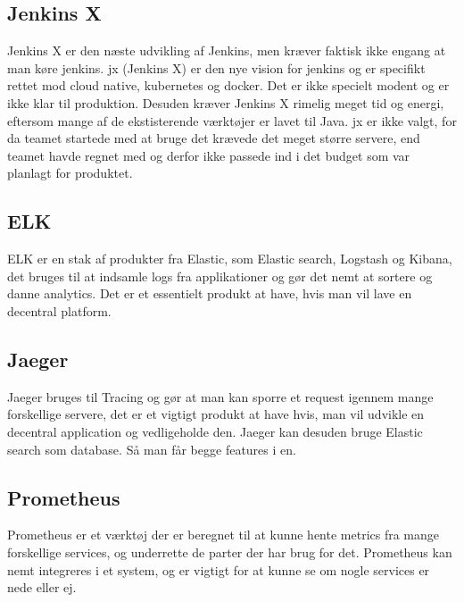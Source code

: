 \subsection{Jenkins X}

Jenkins X er den næste udvikling af Jenkins, men kræver faktisk ikke engang at man køre jenkins. jx (Jenkins X) er den nye vision for jenkins og er specifikt rettet mod cloud native, kubernetes og docker. Det er ikke specielt modent og er ikke klar til produktion. Desuden kræver Jenkins X rimelig meget tid og energi, eftersom mange af de ekstisterende værktøjer er lavet til Java. jx er ikke valgt, for da teamet startede med at bruge det krævede det meget større servere, end teamet havde regnet med og derfor ikke passede ind i det budget som var planlagt for produktet.

\subsection{ELK}

ELK er en stak af produkter fra Elastic, som Elastic search, Logstash og Kibana, det bruges til at indsamle logs fra applikationer og gør det nemt at sortere og danne analytics. Det er et essentielt produkt at have, hvis man vil lave en decentral platform.

\subsection{Jaeger}

Jaeger bruges til Tracing og gør at man kan sporre et request igennem mange forskellige servere, det er et vigtigt produkt at have hvis, man vil udvikle en decentral application og vedligeholde den. Jaeger kan desuden bruge Elastic search som database. Så man får begge features i en.

\subsection{Prometheus}

Prometheus er et værktøj der er beregnet til at kunne hente metrics fra mange forskellige services, og underrette de parter der har brug for det. Prometheus kan nemt integreres i et system, og er vigtigt for at kunne se om nogle services er nede eller ej.


